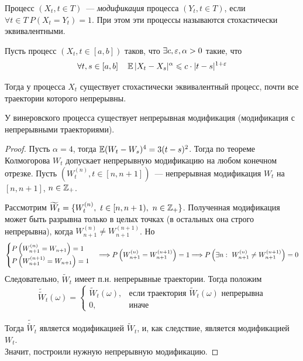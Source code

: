 \begin{definition}
    Процесс $(X_t, t \in T)$~--- \textit{модификация} процесса $(Y_t, t \in T)$, если $\forall t \in T \  P(X_t = Y_t) = 1$.  При этом эти процессы называются стохастически эквивалентными.
\end{definition}


\begin{theorem}

Пусть процесс $(X_t, t \in [a, b])$ таков, что $\exists c, \varepsilon, \alpha > 0$ такие, что
$$
\forall t, s \in [a, b] \quad \operatorname{\mathbb{E}} |X_t - X_s|^\alpha \leqslant c \cdot |t - s|^{1 + \varepsilon}
$$

Тогда у процесса $X_t$ существует стохастически эквивалентный процесс, почти все
траектории которого непрерывны.
\end{theorem}


\begin{statement}\label{8.3}
     У винеровского процесса существует непрерывная модификация (модификация с непрерывными траекториями).
\end{statement}

\begin{proof}
Пусть $\alpha = 4$, тогда $\operatorname{\mathbb{E}} (W_t - W_s)^4 = 3(t - s)^2$. Тогда по теореме Колмогорова $W_t$ допускает непрерывную модификацию на любом конечном отрезке. Пусть $(W_t^{(n)}, t \in [n, n + 1])$~--- непрерывная модификация $W_t$ на $[n, n + 1]$, $n \in \mathbb{Z}_+$.

Рассмотрим $\widetilde{W}_t =\{W_t^{(n)}, \ t \in [n, n + 1), \  n \in \Z_+\}$. Полученная модификация может быть разрывна только в целых точках (в остальных она строго непрерывна), когда $W_{n+1}^{(n)} \neq W_{n+1}^{(n + 1)}$. Но
$$
\begin{cases}
    P\left({W_{n + 1}^{(n)} = W_{n + 1}}\right) = 1 \\
    P\left({W_{n + 1}^{(n + 1)} = W_{n + 1}}\right) = 1 \\
\end{cases}
\Longrightarrow P\left({W_{n + 1}^{(n)} = W_{n + 1}^{(n + 1)}}\right) = 1 \Longrightarrow P\left({\exists n: \ W_{n + 1}^{(n)} \ne W_{n + 1}^{(n + 1)}}\right) = 0
$$
Следовательно, $\widetilde{W}_t$ имеет п.н. непрерывные траектории. Тогда положим
$$
\widetilde{\widetilde{W}}_t (\omega) = 
\begin{cases}
    \widetilde{W}_t (\omega), & \text{если траектория $\widetilde{W}_t(\omega)$ непрерывна} \\
    0, & \text{иначе}
\end{cases}
$$

Тогда $\widetilde{\widetilde{W}}_t$ является модификацией $\widetilde{W}_t$, и, как следствие, является модификацией $W_t$.\\
Значит, построили нужную непрерывную модификацию.
\end{proof} 

